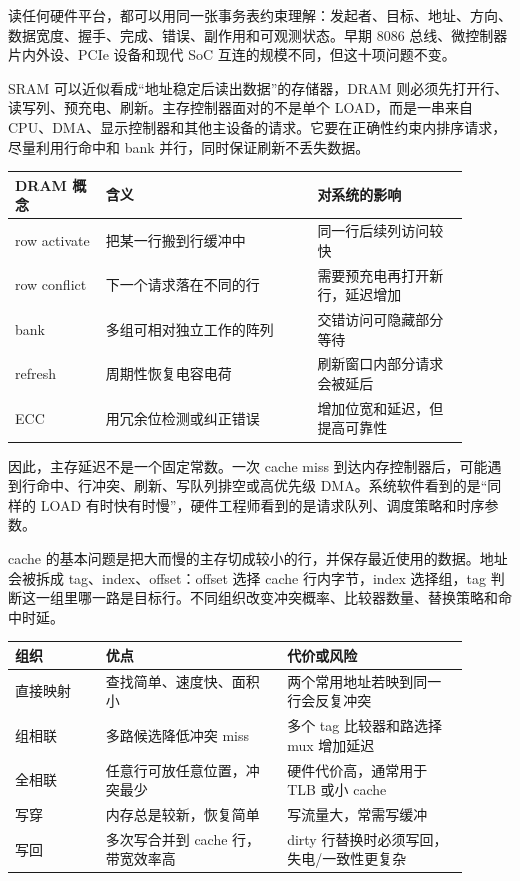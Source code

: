 \begin{classicnote}
读任何硬件平台，都可以用同一张事务表约束理解：发起者、目标、地址、方向、数据宽度、握手、完成、错误、副作用和可观测状态。早期 8086 总线、微控制器片内外设、PCIe 设备和现代 SoC 互连的规模不同，但这十项问题不变。
\end{classicnote}

SRAM 可以近似看成“地址稳定后读出数据”的存储器，DRAM 则必须先打开行、读写列、预充电、刷新。主存控制器面对的不是单个 LOAD，而是一串来自 CPU、DMA、显示控制器和其他主设备的请求。它要在正确性约束内排序请求，尽量利用行命中和 bank 并行，同时保证刷新不丢失数据。

\begin{longtable}{L{0.18\linewidth}L{0.42\linewidth}L{0.3\linewidth}}
\toprule
DRAM 概念 & 含义 & 对系统的影响 \\
\midrule
row activate & 把某一行搬到行缓冲中 & 同一行后续列访问较快 \\\tablerowrule
row conflict & 下一个请求落在不同的行 & 需要预充电再打开新行，延迟增加 \\\tablerowrule
bank & 多组可相对独立工作的阵列 & 交错访问可隐藏部分等待 \\\tablerowrule
refresh & 周期性恢复电容电荷 & 刷新窗口内部分请求会被延后 \\\tablerowrule
ECC & 用冗余位检测或纠正错误 & 增加位宽和延迟，但提高可靠性 \\
\bottomrule
\end{longtable}

因此，主存延迟不是一个固定常数。一次 cache miss 到达内存控制器后，可能遇到行命中、行冲突、刷新、写队列排空或高优先级 DMA。系统软件看到的是“同样的 LOAD 有时快有时慢”，硬件工程师看到的是请求队列、调度策略和时序参数。

cache 的基本问题是把大而慢的主存切成较小的行，并保存最近使用的数据。地址会被拆成 tag、index、offset：offset 选择 cache 行内字节，index 选择组，tag 判断这一组里哪一路是目标行。不同组织改变冲突概率、比较器数量、替换策略和命中时延。

\begin{longtable}{L{0.18\linewidth}L{0.36\linewidth}L{0.36\linewidth}}
\toprule
组织 & 优点 & 代价或风险 \\
\midrule
直接映射 & 查找简单、速度快、面积小 & 两个常用地址若映到同一行会反复冲突 \\\tablerowrule
组相联 & 多路候选降低冲突 miss & 多个 tag 比较器和路选择 mux 增加延迟 \\\tablerowrule
全相联 & 任意行可放任意位置，冲突最少 & 硬件代价高，通常用于 TLB 或小 cache \\\tablerowrule
写穿 & 内存总是较新，恢复简单 & 写流量大，常需写缓冲 \\\tablerowrule
写回 & 多次写合并到 cache 行，带宽效率高 & dirty 行替换时必须写回，失电/一致性更复杂 \\
\bottomrule
\end{longtable}

